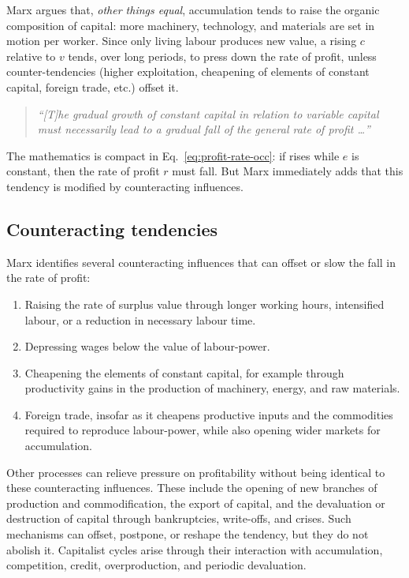 Marx argues that, \emph{other things equal}, accumulation tends to raise the organic composition of capital:
more machinery, technology, and materials are set in motion per worker. Since only living labour produces
new value, a rising $c$ relative to $v$ tends, over long periods, to press down the rate of profit, unless
counter-tendencies (higher exploitation, cheapening of elements of constant capital, foreign trade, etc.)
offset it.

\begin{quote}
\emph{``[T]he gradual growth of constant capital in relation to variable capital must necessarily lead to a
gradual fall of the general rate of profit \dots''}\cite{Marx1894}
\end{quote}


The mathematics is compact in Eq.~\eqref{eq:profit-rate-occ}: if \OCC{} rises while $e$ is constant, then the rate of profit $r$ must fall. But Marx immediately adds that this tendency is modified by counteracting influences.

\subsection{Counteracting tendencies}

Marx identifies several counteracting influences that can offset or slow the
fall in the rate of profit:

\begin{enumerate}[leftmargin=1.5em]
  \item Raising the rate of surplus value through longer working hours,
  intensified labour, or a reduction in necessary labour time.

  \item Depressing wages below the value of labour-power.

  \item Cheapening the elements of constant capital, for example through
  productivity gains in the production of machinery, energy, and raw
  materials.

  \item Foreign trade, insofar as it cheapens productive inputs and the
  commodities required to reproduce labour-power, while also opening wider
  markets for accumulation.
\end{enumerate}

Other processes can relieve pressure on profitability without being identical
to these counteracting influences. These include the opening of new branches
of production and commodification, the export of capital, and the devaluation
or destruction of capital through bankruptcies, write-offs, and crises. Such
mechanisms can offset, postpone, or reshape the tendency, but they do not
abolish it. Capitalist cycles arise through their interaction with accumulation,
competition, credit, overproduction, and periodic devaluation.

